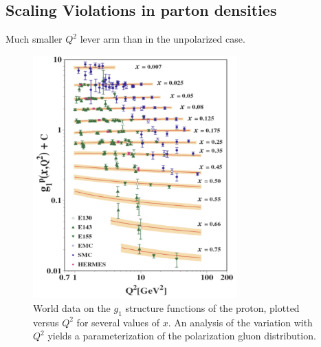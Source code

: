 \subsection{Scaling Violations in parton densities}

Much smaller $Q^2$ lever arm than in the unpolarized case.

\begin{figure}
  \centering
  \includegraphics[width=0.7\textwidth]{figures/g1_x_q2}
  \caption{World data on the $g_1$ structure functions of the proton, plotted versus $Q^2$ for several values of $x$.  An analysis of the variation with $Q^2$ yields a parameterization of the polarization gluon distribution.} %
  \label{fig:g1-versus-q2}
\end{figure}


